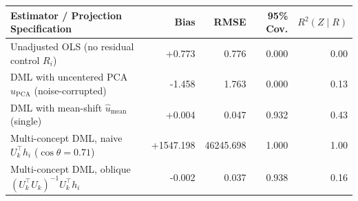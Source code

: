 \begin{tabular}{@{}l rrrr@{}}
\toprule
Estimator / Projection Specification & Bias & RMSE & 95\% Cov. & $R^2(Z \mid R)$ \\
\midrule
Unadjusted OLS (no residual control $R_i$) & +0.773 & 0.776 & 0.000 & 0.00 \\
DML with uncentered PCA $\hat{u}_{\mathrm{PCA}}$ (noise-corrupted) & -1.458 & 1.763 & 0.000 & 0.13 \\
DML with mean-shift $\hat{u}_{\mathrm{mean}}$ (single) & +0.004 & 0.047 & 0.932 & 0.43 \\
Multi-concept DML, naive $U_k^\top h_i$ ($\cos\theta = 0.71$) & +1547.198 & 46245.698 & 1.000 & 1.00 \\
Multi-concept DML, oblique $(U_k^\top U_k)^{-1}U_k^\top h_i$ & -0.002 & 0.037 & 0.938 & 0.16 \\
\bottomrule
\end{tabular}
